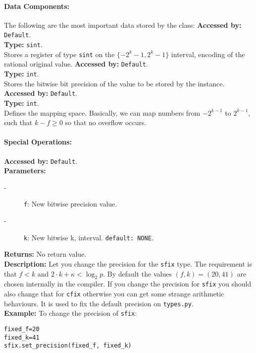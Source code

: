 \paragraph{Data Components:}
The following are the most important data stored by the class:
\textbf{Accessed by:} \verb|Default|.\\
\textbf{Type:} \verb|sint|.\\
Stores a register of type \verb|sint| on the $\{-2^k-1, 2^k-1\}$ interval, encoding of the rational original value.
\textbf{Accessed by:} \verb|Default|.\\
\textbf{Type:} \verb|int|.\\
Stores the bitwise bit precision of the value to be stored by the instance.
\textbf{Accessed by:} \verb|Default|.\\
\textbf{Type:} \verb|int|.\\
Defines the mapping space. Basically, we can map numbers  from $-2^{k-1}$ to $2^{k-1}$, such that $k-f \geq 0$ so that no overflow occurs.

\paragraph {Special Operations:}

\textbf{Accessed by:} \verb|Default|.\\
\textbf{Parameters:}
\begin{description}
  \item[-] \verb|f|: New bitwise precision  value.
  \item[-] \verb|k|: New bitwise k, interval. \verb|default: NONE|.
\end{description}
\textbf{Returns:} No return value. \\
\textbf{Description:}
Let you change the precision for the \verb|sfix| type.
The requirement is that $f<k$ and $2 \cdot k + \kappa < \log_2 p$.
By default the values $(f,k)=(20,41)$ are chosen internally in the compiler.
If you change the precision for \verb|sfix| you should also change that for
\verb|cfix| otherwise you can get some strange arithmetic behaviours.
It is used to fix the default precision on \verb|types.py|.  \\
\textbf{Example:}
To change the precision of \verb|sfix|:
\begin{lstlisting}
fixed_f=20
fixed_k=41
sfix.set_precision(fixed_f, fixed_k)
\end{lstlisting}

